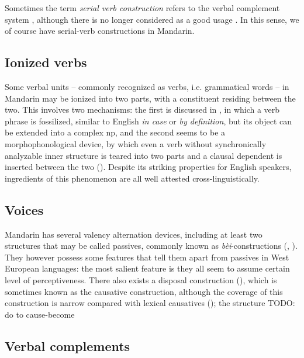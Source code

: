 \documentclass[UTF8, a4paper, oneside, scheme=plain, 12pt]{ctexrep}
\newcommand*{\citesec}[1]{\S~{#1}}
\newcommand*{\term}[1]{\emph{#1}}
\newcommand{\form}[1]{\emph{#1}}
\begin{document}
Sometimes the term \term{serial verb construction} 
refers to the verbal complement system
\citep{chen2016mandarin}, 
although there is no longer considered as a good usage 
\citep[\citesec{10.1}; note that the V2s in Yakkha complex predication highly resembles Mandarin directional verbal complements 
in their formal aspects]{schackow2015grammar}. 
In this sense, we of course have serial-verb constructions in Mandarin.

\subsection{Ionized verbs}

Some verbal units -- commonly recognized as verbs, i.e. grammatical words -- in Mandarin
may be ionized into two parts, 
with a constituent residing between the two. 
This involves two mechanisms:
the first is discussed in , 
in which a verb phrase is fossilized, 
similar to English \form{in case} or \form{by definition},  
but its object can be extended into a complex \acs{np},
and the second seems to be a morphophonological device, 
by which even a verb without synchronically analyzable inner structure 
is teared into two parts and a clausal dependent is inserted between the two 
().
Despite its striking properties for English speakers, 
ingredients of this phenomenon are all well attested cross-linguistically.

\subsection{Voices}

Mandarin has several valency alternation devices, 
including at least two structures 
that may be called passives,
commonly known as \form{bèi}-constructions
(,
).
They however possess some features that tell them apart 
from passives in West European languages:
the most salient feature is 
they all seem to assume certain level of perceptiveness.
There also exists a disposal construction 
(),
which is sometimes known as the causative construction,
although the coverage of this construction 
is narrow compared with lexical causatives ();
the structure TODO: do to cause-become 



\subsection{Verbal complements}
\end{document}
